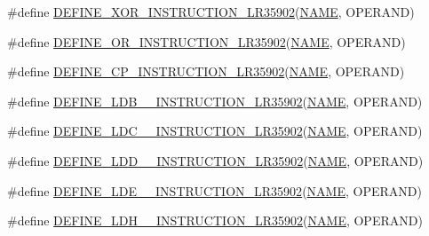 \begin{DoxyCompactItemize}
\item 
\#define \mbox{\hyperlink{isa-lr35902_8c_a87fe53bda6581408cd93385a5620dcfd}{D\+E\+F\+I\+N\+E\+\_\+\+X\+O\+R\+\_\+\+I\+N\+S\+T\+R\+U\+C\+T\+I\+O\+N\+\_\+\+L\+R35902}}(\mbox{\hyperlink{inflate_8h_a164ea0159d5f0b5f12a646f25f99eceaa67bc2ced260a8e43805d2480a785d312}{N\+A\+ME}},  O\+P\+E\+R\+A\+ND)
\item 
\#define \mbox{\hyperlink{isa-lr35902_8c_aded2ca3c52ab860a9e755505f8e9d941}{D\+E\+F\+I\+N\+E\+\_\+\+O\+R\+\_\+\+I\+N\+S\+T\+R\+U\+C\+T\+I\+O\+N\+\_\+\+L\+R35902}}(\mbox{\hyperlink{inflate_8h_a164ea0159d5f0b5f12a646f25f99eceaa67bc2ced260a8e43805d2480a785d312}{N\+A\+ME}},  O\+P\+E\+R\+A\+ND)
\item 
\#define \mbox{\hyperlink{isa-lr35902_8c_ab884e04973eae57e5ce23844d5284816}{D\+E\+F\+I\+N\+E\+\_\+\+C\+P\+\_\+\+I\+N\+S\+T\+R\+U\+C\+T\+I\+O\+N\+\_\+\+L\+R35902}}(\mbox{\hyperlink{inflate_8h_a164ea0159d5f0b5f12a646f25f99eceaa67bc2ced260a8e43805d2480a785d312}{N\+A\+ME}},  O\+P\+E\+R\+A\+ND)
\item 
\#define \mbox{\hyperlink{isa-lr35902_8c_ac296c8aad7b29322b9ded9e009f9cbab}{D\+E\+F\+I\+N\+E\+\_\+\+L\+D\+B\+\_\+\+\_\+\+I\+N\+S\+T\+R\+U\+C\+T\+I\+O\+N\+\_\+\+L\+R35902}}(\mbox{\hyperlink{inflate_8h_a164ea0159d5f0b5f12a646f25f99eceaa67bc2ced260a8e43805d2480a785d312}{N\+A\+ME}},  O\+P\+E\+R\+A\+ND)
\item 
\#define \mbox{\hyperlink{isa-lr35902_8c_aba0b4df06518bf4b1717f9240d8ab560}{D\+E\+F\+I\+N\+E\+\_\+\+L\+D\+C\+\_\+\+\_\+\+I\+N\+S\+T\+R\+U\+C\+T\+I\+O\+N\+\_\+\+L\+R35902}}(\mbox{\hyperlink{inflate_8h_a164ea0159d5f0b5f12a646f25f99eceaa67bc2ced260a8e43805d2480a785d312}{N\+A\+ME}},  O\+P\+E\+R\+A\+ND)
\item 
\#define \mbox{\hyperlink{isa-lr35902_8c_a4d47351734766869a8250372b5f53cad}{D\+E\+F\+I\+N\+E\+\_\+\+L\+D\+D\+\_\+\+\_\+\+I\+N\+S\+T\+R\+U\+C\+T\+I\+O\+N\+\_\+\+L\+R35902}}(\mbox{\hyperlink{inflate_8h_a164ea0159d5f0b5f12a646f25f99eceaa67bc2ced260a8e43805d2480a785d312}{N\+A\+ME}},  O\+P\+E\+R\+A\+ND)
\item 
\#define \mbox{\hyperlink{isa-lr35902_8c_a7c4118e1601a4889451ba194eb68561d}{D\+E\+F\+I\+N\+E\+\_\+\+L\+D\+E\+\_\+\+\_\+\+I\+N\+S\+T\+R\+U\+C\+T\+I\+O\+N\+\_\+\+L\+R35902}}(\mbox{\hyperlink{inflate_8h_a164ea0159d5f0b5f12a646f25f99eceaa67bc2ced260a8e43805d2480a785d312}{N\+A\+ME}},  O\+P\+E\+R\+A\+ND)
\item 
\#define \mbox{\hyperlink{isa-lr35902_8c_a4204274a729b64439d138c2a4524b575}{D\+E\+F\+I\+N\+E\+\_\+\+L\+D\+H\+\_\+\+\_\+\+I\+N\+S\+T\+R\+U\+C\+T\+I\+O\+N\+\_\+\+L\+R35902}}(\mbox{\hyperlink{inflate_8h_a164ea0159d5f0b5f12a646f25f99eceaa67bc2ced260a8e43805d2480a785d312}{N\+A\+ME}},  O\+P\+E\+R\+A\+ND)

\end{DoxyCompactItemize}
